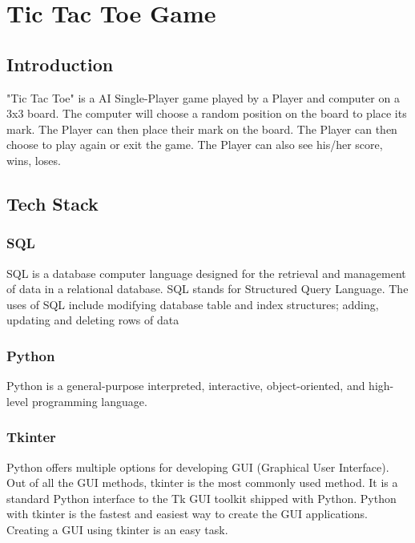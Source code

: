 \chapter{Tic Tac Toe Game}
\section{Introduction}
"Tic Tac Toe" is a AI Single-Player game played by a Player and computer on a 3x3 board.
The computer will choose a random position on the board to place its mark.
The Player can then place their mark on the board.
The Player can then choose to play again or exit the game.
The Player can also see his/her score, wins, loses.
\section{Tech Stack}
\label{Tech_Stack}
\subsection{SQL}
SQL is a database computer language designed for the retrieval and management of data in a relational database. SQL stands for Structured Query Language. The uses of SQL include modifying database table and index structures; adding, updating and deleting rows of data
\subsection{Python}
Python is a general-purpose interpreted, interactive, object-oriented, and high-level programming language. 
\subsection{Tkinter}
Python offers multiple options for developing GUI (Graphical User Interface). Out of all the GUI methods, tkinter is the most commonly used method. It is a standard Python interface to the Tk GUI toolkit shipped with Python. Python with tkinter is the fastest and easiest way to create the GUI applications. Creating a GUI using tkinter is an easy task.
